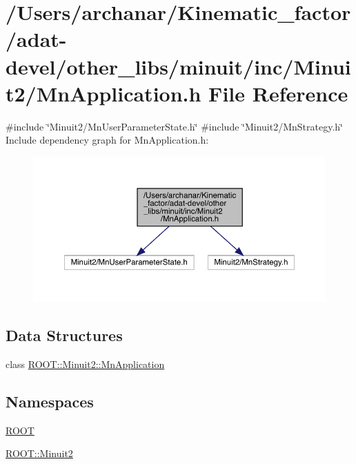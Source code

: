 \hypertarget{adat-devel_2other__libs_2minuit_2inc_2Minuit2_2MnApplication_8h}{}\section{/\+Users/archanar/\+Kinematic\+\_\+factor/adat-\/devel/other\+\_\+libs/minuit/inc/\+Minuit2/\+Mn\+Application.h File Reference}
\label{adat-devel_2other__libs_2minuit_2inc_2Minuit2_2MnApplication_8h}
{\ttfamily \#include \char`\"{}Minuit2/\+Mn\+User\+Parameter\+State.\+h\char`\"{}}\newline
{\ttfamily \#include \char`\"{}Minuit2/\+Mn\+Strategy.\+h\char`\"{}}\newline
Include dependency graph for Mn\+Application.\+h\+:
\nopagebreak
\begin{figure}[H]
\begin{center}
\leavevmode
\includegraphics[width=350pt]{dd/dd6/adat-devel_2other__libs_2minuit_2inc_2Minuit2_2MnApplication_8h__incl}
\end{center}
\end{figure}
\subsection*{Data Structures}
\begin{DoxyCompactItemize}
\item 
class \mbox{\hyperlink{classROOT_1_1Minuit2_1_1MnApplication}{R\+O\+O\+T\+::\+Minuit2\+::\+Mn\+Application}}
\end{DoxyCompactItemize}
\subsection*{Namespaces}
\begin{DoxyCompactItemize}
\item 
 \mbox{\hyperlink{namespaceROOT}{R\+O\+OT}}
\item 
 \mbox{\hyperlink{namespaceROOT_1_1Minuit2}{R\+O\+O\+T\+::\+Minuit2}}
\end{DoxyCompactItemize}
